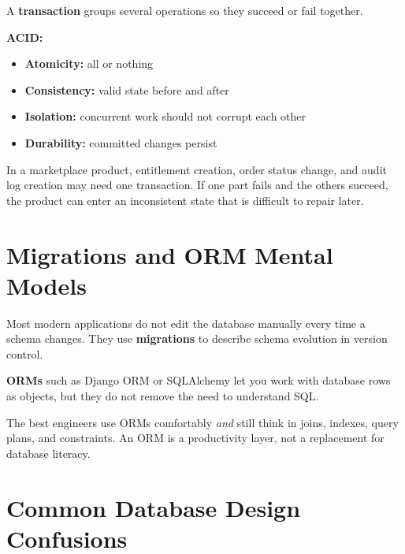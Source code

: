 \documentclass[12pt, a4paper, oneside]{book}
\begin{document}
A \textbf{transaction} groups several operations so they succeed or fail together.

\textbf{ACID:}
\begin{itemize}[leftmargin=2em]
    \item \textbf{Atomicity:} all or nothing
    \item \textbf{Consistency:} valid state before and after
    \item \textbf{Isolation:} concurrent work should not corrupt each other
    \item \textbf{Durability:} committed changes persist
\end{itemize}

\begin{projectbox}
In a marketplace product, entitlement creation, order status change, and audit log creation may need one transaction. If one part fails and the others succeed, the product can enter an inconsistent state that is difficult to repair later.
\end{projectbox}

\section{Migrations and ORM Mental Models}

Most modern applications do not edit the database manually every time a schema changes. They use \textbf{migrations} to describe schema evolution in version control.

\textbf{ORMs} such as Django ORM or SQLAlchemy let you work with database rows as objects, but they do not remove the need to understand SQL.

\begin{notebox}
The best engineers use ORMs comfortably \emph{and} still think in joins, indexes, query plans, and constraints. An ORM is a productivity layer, not a replacement for database literacy.
\end{notebox}

\section{Common Database Design Confusions}
\end{document}
